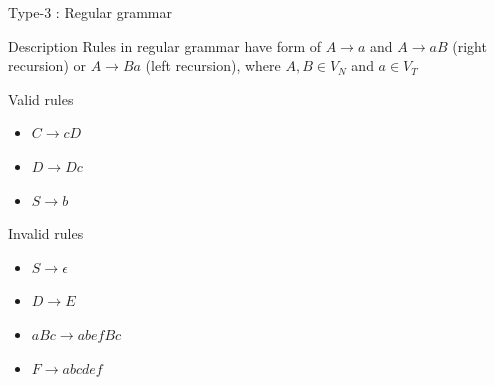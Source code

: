 \documentclass{beamer}
\begin{document}

\begin{frame}{Type-3 : Regular grammar}
	
	\begin{block}{Description}
		Rules in regular grammar have form of $A\rightarrow a$ and $A\rightarrow aB$ (right recursion) or $A\rightarrow Ba$ (left recursion), where $A,B\in V_N$ and $a\in V_T$
	\end{block}
	
	\begin{exampleblock}{Valid rules}
		\begin{itemize}
			\item $C \rightarrow cD$
			\item $D \rightarrow Dc$
			\item $S \rightarrow b$
		\end{itemize}
	\end{exampleblock}
	
	\begin{alertblock}{Invalid rules}
		\begin{itemize}
			\item $S \rightarrow \epsilon$
			\item $D \rightarrow E$
			\item $aBc \rightarrow abefBc$			
			\item $F \rightarrow abcdef$			
		\end{itemize}
	\end{alertblock}
	
\end{frame}

\end{document}
